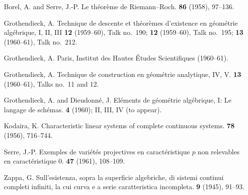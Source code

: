 \documentclass{article}
\begin{document}
\nocite{*}
\begin{thebibliography}{8}

  {\sc Borel, A. and Serre, J.-P.}
  \newblock Le th\'{e}or\`{e}me de Riemann--Roch.
   \textbf{86} (1958), 97--136.

  {\sc Grothendieck, A.}
  \newblock Technique de descente et th\'{e}or\`{e}mes d'existence en g\'{e}om\'{e}trie alg\'{e}brique, I, II, III
   \textbf{12} (1959--60), Talk no.~190; \textbf{12} (1959--60), Talk no.~195; \textbf{13} (1960--61), Talk no.~212.

  {\sc Grothendieck, A.}
  \newblock Paris, Institut des Hautes \'{E}tudes Scientifiques (1960--61).

  {\sc Grothendieck, A.}
  \newblock Technique de construction en g\'{e}om\'{e}trie analytique, IV, V.
   \textbf{13} (1960--61), Talks no.~11 and 12.

  {\sc Grothendieck, A. and Dieudonn\'{e}, J.}
  \newblock El\'{e}ments de g\'{e}om\'{e}trie alg\'{e}brique, I: Le langage de sch\'{e}mas.
   \textbf{4} (1960); II, III, IV (to appear).

  {\sc Kodaira, K.}
  \newblock Characteristic linear systems of complete continuous systems.
   \textbf{78} (1956), 716--744.

  {\sc Serre, J.-P.}
  \newblock Exemples de vari\'{e}t\'{e}s projectives en caract\'{e}ristique $p$ non relevables en caract\'{e}ristique $0$.
   \textbf{47} (1961), 108--109.

  {\sc Zappa, G.}
  \newblock Sull'esistenza, sopra la superficie algebriche, di sistemi continui completi infiniti, la cui curva e a serie caratteristica incompleta.
   \textbf{9} (1945), 91--93.

\end{thebibliography}
\end{document}
